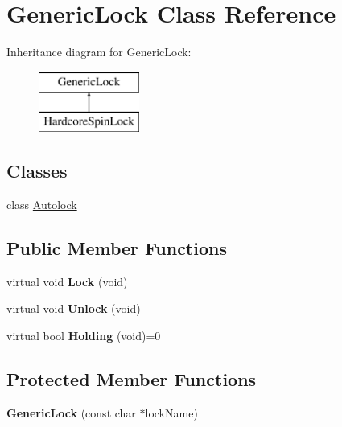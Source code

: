 \hypertarget{class_generic_lock}{}\section{Generic\+Lock Class Reference}
\label{class_generic_lock}
Inheritance diagram for Generic\+Lock\+:\begin{figure}[H]
\begin{center}
\leavevmode
\includegraphics[height=2.000000cm]{class_generic_lock}
\end{center}
\end{figure}
\subsection*{Classes}
\begin{DoxyCompactItemize}
\item 
class \hyperlink{class_generic_lock_1_1_autolock}{Autolock}
\end{DoxyCompactItemize}
\subsection*{Public Member Functions}
\begin{DoxyCompactItemize}
\item 
\mbox{\label{class_generic_lock_a78b911107ad38f5ea3db5f382e7100a5}} 
virtual void {\bfseries Lock} (void)
\item 
\mbox{\label{class_generic_lock_aef3829188e15b0968c2fa14a8f754d5b}} 
virtual void {\bfseries Unlock} (void)
\item 
\mbox{\label{class_generic_lock_ae0ed0d1aa6503437763c7eedd76eaa86}} 
virtual bool {\bfseries Holding} (void)=0
\end{DoxyCompactItemize}
\subsection*{Protected Member Functions}
\begin{DoxyCompactItemize}
\item 
\mbox{\label{class_generic_lock_a6a310d2226a52bd5e5213b56becf2e1d}} 
{\bfseries Generic\+Lock} (const char $\ast$lock\+Name)
\end{DoxyCompactItemize}
